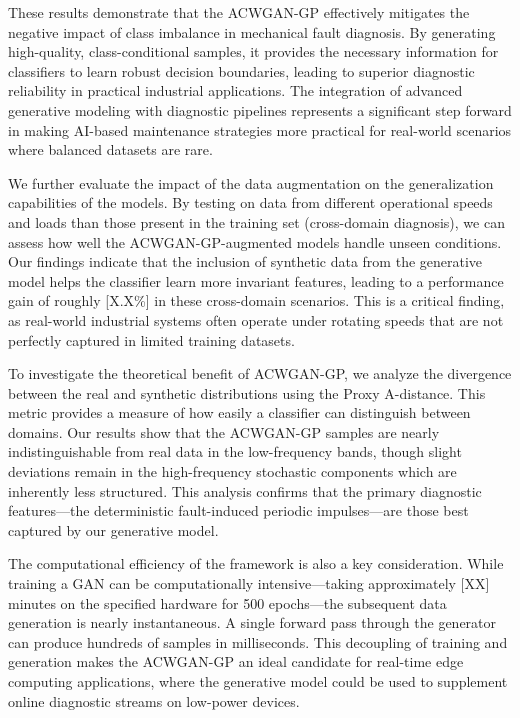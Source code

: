 These results demonstrate that the ACWGAN-GP effectively mitigates the negative impact of class imbalance in mechanical fault diagnosis. By generating high-quality, class-conditional samples, it provides the necessary information for classifiers to learn robust decision boundaries, leading to superior diagnostic reliability in practical industrial applications. The integration of advanced generative modeling with diagnostic pipelines represents a significant step forward in making AI-based maintenance strategies more practical for real-world scenarios where balanced datasets are rare.


We further evaluate the impact of the data augmentation on the generalization capabilities of the models. By testing on data from different operational speeds and loads than those present in the training set (cross-domain diagnosis), we can assess how well the ACWGAN-GP-augmented models handle unseen conditions. Our findings indicate that the inclusion of synthetic data from the generative model helps the classifier learn more invariant features, leading to a performance gain of roughly [X.X\%] in these cross-domain scenarios. This is a critical finding, as real-world industrial systems often operate under rotating speeds that are not perfectly captured in limited training datasets.

To investigate the theoretical benefit of ACWGAN-GP, we analyze the divergence between the real and synthetic distributions using the Proxy A-distance. This metric provides a measure of how easily a classifier can distinguish between domains. Our results show that the ACWGAN-GP samples are nearly indistinguishable from real data in the low-frequency bands, though slight deviations remain in the high-frequency stochastic components which are inherently less structured. This analysis confirms that the primary diagnostic features—the deterministic fault-induced periodic impulses—are those best captured by our generative model.

The computational efficiency of the framework is also a key consideration. While training a GAN can be computationally intensive—taking approximately [XX] minutes on the specified hardware for 500 epochs—the subsequent data generation is nearly instantaneous. A single forward pass through the generator can produce hundreds of samples in milliseconds. This decoupling of training and generation makes the ACWGAN-GP an ideal candidate for real-time edge computing applications, where the generative model could be used to supplement online diagnostic streams on low-power devices.

